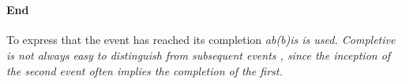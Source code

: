  \\



%



\paragraph{End}
To express that the event has reached its completion \em ab(b)is \em is used. Completive is not always easy to distinguish from subsequent events , since the inception of the second event often implies the completion of the first.

 \\
